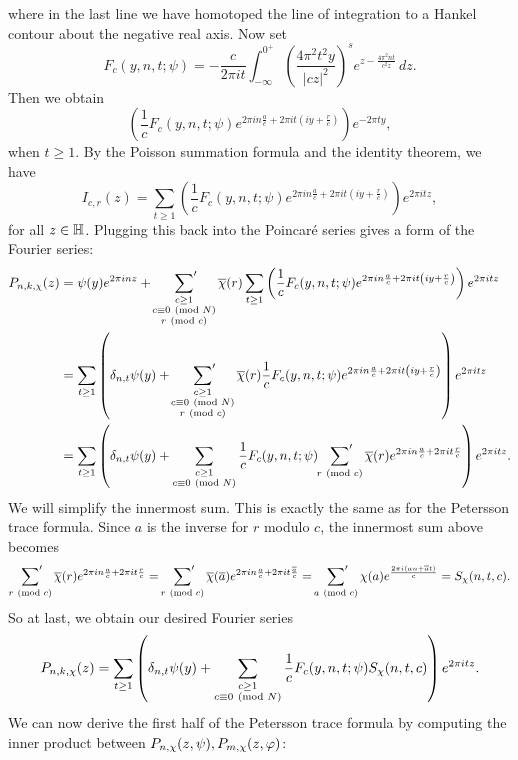     where in the last line we have homotoped the line of integration to a Hankel contour about the negative real axis. Now set
    \[
      F_{c}(y,n,t;\psi) = -\frac{c}{2\pi it}\int_{-\infty}^{0^{+}}\left(\frac{4\pi^{2}t^{2}y}{|cz|^{2}}\right)^{s}e^{z-\frac{4\pi^{2}nt}{c^{2}z}}\,dz.
    \]
    Then we obtain
    \[
      \left(\frac{1}{c}F_{c}(y,n,t;\psi)e^{2\pi in\frac{a}{c}+2\pi it\left(iy+\frac{r}{c}\right)}\right)e^{-2\pi ty},
    \]
    when $t \ge 1$. By the Poisson summation formula and the identity theorem, we have
    \[
      I_{c,r}(z) = \sum_{t \ge 1}\left(\frac{1}{c}F_{c}(y,n,t;\psi)e^{2\pi in\frac{a}{c}+2\pi it\left(iy+\frac{r}{c}\right)}\right)e^{2\pi itz},
    \]
    for all $z \in \mathbb{H}$. Plugging this back into the Poincar\'e series gives a form of the Fourier series:
    \begin{align*}
      P_{n,k,\chi}(z) &= \psi(y)e^{2\pi inz}+\sideset{}{'}\sum_{\substack{c \ge 1 \\ c \equiv 0 \ \left(\text{mod }N\right) \\ r \ \left(\text{mod }c\right)}}\overline{\chi}(r)\sum_{t \ge 1}\left(\frac{1}{c}F_{c}(y,n,t;\psi)e^{2\pi in\frac{a}{c}+2\pi it\left(iy+\frac{r}{c}\right)}\right)e^{2\pi itz} \\
      &= \sum_{t \ge 1}\left(\delta_{n,t}\psi(y)+\sideset{}{'}\sum_{\substack{c \ge 1 \\ c \equiv 0 \ \left(\text{mod }N\right) \\ r \ \left(\text{mod }c\right)}}\overline{\chi}(r)\frac{1}{c}F_{c}(y,n,t;\psi)e^{2\pi in\frac{a}{c}+2\pi it\left(iy+\frac{r}{c}\right)}\right)e^{2\pi itz} \\
      &= \sum_{t \ge 1}\left(\delta_{n,t}\psi(y)+\sum_{\substack{c \ge 1 \\ c \equiv 0 \ \left(\text{mod }N\right)}}\frac{1}{c}F_{c}(y,n,t;\psi)\sideset{}{'}\sum_{r \ \left(\text{mod }c\right)}\overline{\chi}(r)e^{2\pi in\frac{a}{c}+2\pi it\frac{r}{c}}\right)e^{2\pi itz}.
    \end{align*}
    We will simplify the innermost sum. This is exactly the same as for the Petersson trace formula. Since $a$ is the inverse for $r$ modulo $c$, the innermost sum above becomes
    \[
      \sideset{}{'}\sum_{r \ \left(\text{mod }c\right)}\overline{\chi}(r)e^{2\pi in\frac{a}{c}+2\pi it\frac{r}{c}} = \sideset{}{'}\sum_{r \ \left(\text{mod }c\right)}\overline{\chi}(\overline{a})e^{2\pi in\frac{a}{c}+2\pi it\frac{\overline{a}}{c}} = \sideset{}{'}\sum_{a \ \left(\text{mod }c\right)}\chi(a)e^{\frac{2\pi i(an+\overline{a}t)}{c}} = S_{\chi}(n,t,c).
    \]
    So at last, we obtain our desired Fourier series
    \[
      P_{n,k,\chi}(z) = \sum_{t \ge 1}\left(\delta_{n,t}\psi(y)+\sum_{\substack{c \ge 1 \\ c \equiv 0 \ \left(\text{mod }N\right)}}\frac{1}{c}F_{c}(y,n,t;\psi)S_{\chi}(n,t,c)\right)e^{2\pi itz}.
    \]
    We can now derive the first half of the Petersson trace formula by computing the inner product between $P_{n,\chi}(z,\psi),P_{m,\chi}(z,\varphi)$: 
